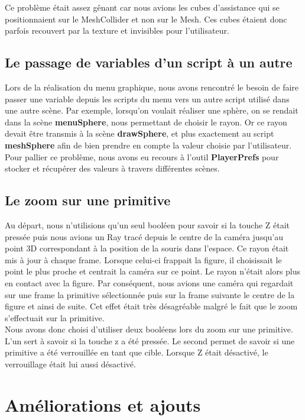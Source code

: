 \documentclass[a4paper,oneside,12pt,titlepage]{article}
\begin{document}
Ce problème était assez gênant car nous avions les cubes d'assistance qui se positionnaient sur le MeshCollider et non sur le Mesh. Ces cubes étaient donc parfois recouvert par la texture et invisibles pour l'utilisateur.


\subsection{Le passage de variables d'un script à un autre}

Lors de la réalisation du menu graphique, nous avons rencontré le besoin de faire passer une variable depuis les scripts du menu vers un autre script utilisé dans une autre scène. Par exemple, lorsqu'on voulait réaliser une sphère, on se rendait dans la scène \textbf{menuSphere}, nous permettant de choisir le rayon. Or ce rayon devait être transmis à la scène \textbf{drawSphere}, et plus exactement au script \textbf{meshSphere} afin de bien prendre en compte la valeur choisie par l'utilisateur. Pour pallier ce problème, nous avons eu recours à l'outil \textbf{PlayerPrefs} pour stocker et récupérer des valeurs à travers différentes scènes.


\subsection{Le zoom sur une primitive}
Au départ, nous n'utilisions qu'un seul booléen pour savoir si la touche Z était pressée puis nous avions un Ray tracé depuis le centre de la caméra jusqu'au point 3D correspondant à la position de la souris dans l'espace. Ce rayon était mis à jour à chaque frame. Lorsque celui-ci frappait la figure, il choisissait le point le plus proche et centrait la caméra sur ce point. Le rayon n'était alors plus en contact avec la figure. Par conséquent, nous avions une caméra qui regardait sur une frame la primitive sélectionnée puis sur la frame suivante le centre de la figure et ainsi de suite. Cet effet était très désagréable malgré le fait que le zoom s'effectuait sur la primitive.\\ 
Nous avons donc choisi d'utiliser deux booléens lors du zoom sur une primitive. L'un sert à savoir si la touche z a été pressée. Le second permet de savoir si une primitive a été verrouillée en tant que cible. Lorsque Z était désactivé, le verrouillage était lui aussi désactivé.
\section{Améliorations et ajouts}
\end{document}
